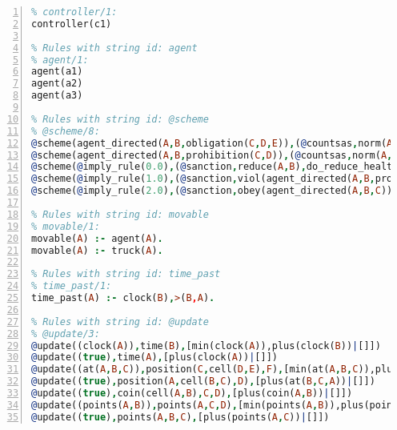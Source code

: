\documentclass[11pt]{article}\usepackage[utf8]{inputenc}\usepackage{geometry}
\begin{document}
\begin{lstlisting}[language=Prolog, numbers=left]
% Rules with string id: controller
% controller/1:
controller(c1)

% Rules with string id: agent
% agent/1:
agent(a1)
agent(a2)
agent(a3)

% Rules with string id: @scheme
% @scheme/8:
@scheme(agent_directed(A,B,obligation(C,D,E)),(@countsas,norm(A,B,F,obligation(C,D,E)),F),false,(listTrue(C)),(time_past(D)),false,[plus(viol(agent_directed(A,B,obligation(C,D,E))))|[]],[plus(obey(agent_directed(A,B,obligation(C,D,E))))|[]])
@scheme(agent_directed(A,B,prohibition(C,D)),(@countsas,norm(A,B,E,prohibition(C,D)),E),(listTrue(C)),false,(false),false,[plus(viol(agent_directed(A,B,prohibition(C,D))))|[]],[plus(obey(agent_directed(A,B,prohibition(C,D))))|[]])
@scheme(@imply_rule(0.0),(@sanction,reduce(A,B),do_reduce_health(A,B),notifyAgent(A,changed(status))),true,false,false,false,[min(reduce(A,B))|[]],[])
@scheme(@imply_rule(1.0),(@sanction,viol(agent_directed(A,B,prohibition(C,D))),do_sanction(D)),true,false,false,false,[min(viol(agent_directed(A,B,prohibition(C,D))))|[]],[])
@scheme(@imply_rule(2.0),(@sanction,obey(agent_directed(A,B,C))),true,false,false,false,[min(obey(agent_directed(A,B,C)))|[]],[])

% Rules with string id: movable
% movable/1:
movable(A) :- agent(A).
movable(A) :- truck(A).

% Rules with string id: time_past
% time_past/1:
time_past(A) :- clock(B),>(B,A).

% Rules with string id: @update
% @update/3:
@update((clock(A)),time(B),[min(clock(A)),plus(clock(B))|[]])
@update((true),time(A),[plus(clock(A))|[]])
@update((at(A,B,C)),position(C,cell(D,E),F),[min(at(A,B,C)),plus(at(D,E,C))|[]])
@update((true),position(A,cell(B,C),D),[plus(at(B,C,A))|[]])
@update((true),coin(cell(A,B),C,D),[plus(coin(A,B))|[]])
@update((points(A,B)),points(A,C,D),[min(points(A,B)),plus(points(A,D))|[]])
@update((true),points(A,B,C),[plus(points(A,C))|[]])

\end{lstlisting}
\end{document}

